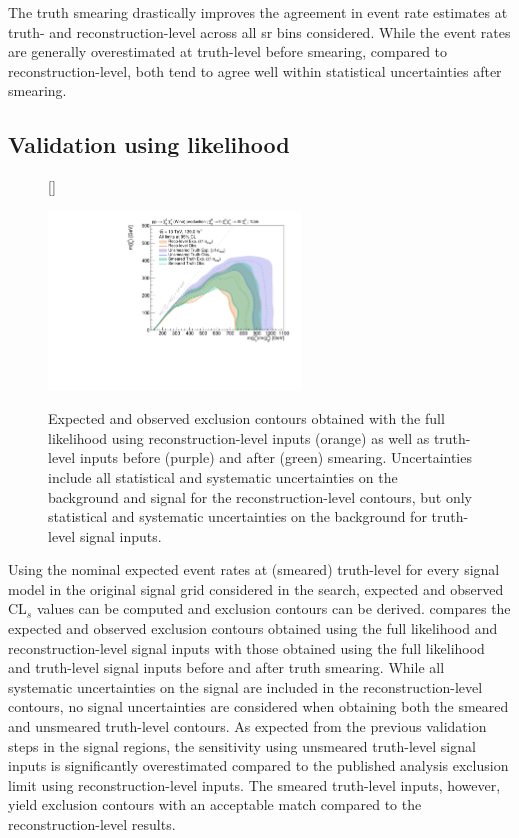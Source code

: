 The truth smearing drastically improves the agreement in event rate estimates at truth- and reconstruction-level across all \gls{sr} bins considered. While the event rates are generally overestimated at truth-level before smearing, compared to reconstruction-level, both tend to agree well within statistical uncertainties after smearing. 
 
\subsection{Validation using likelihood}

\begin{figure}
[\FBwidth]
{\caption{Expected and observed exclusion contours obtained with the full likelihood using reconstruction-level inputs (orange) as well as truth-level inputs before (purple) and after (green) smearing. Uncertainties include all statistical and systematic uncertainties on the background and signal for the reconstruction-level contours, but only statistical and systematic uncertainties on the background for truth-level signal inputs.}\label{fig:smearing_signal_regions}}
{\includegraphics[width=0.60\textwidth]{exclusion_1Lbb_truthInput_compareReco_BkgOnly_noLabel}}
\end{figure}

Using the nominal expected event rates at (smeared) truth-level for every signal model in the original signal grid considered in the \onelepton search, expected and observed CL$_s$ values can be computed and exclusion contours can be derived.  compares the expected and observed exclusion contours obtained using the full likelihood and reconstruction-level signal inputs with those obtained using the full likelihood and truth-level signal inputs before and after truth smearing. While all systematic uncertainties on the signal are included in the reconstruction-level contours, no signal uncertainties are considered when obtaining both the smeared and unsmeared truth-level contours. As expected from the previous validation steps in the signal regions, the sensitivity using unsmeared truth-level signal inputs is significantly overestimated compared to the published analysis exclusion limit using reconstruction-level inputs. The smeared truth-level inputs, however, yield exclusion contours with an acceptable match compared to the reconstruction-level results.

